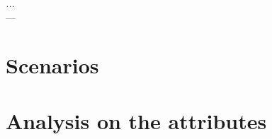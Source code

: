 \label{chap:methodology}


\begin{flushright}{\slshape
    ... } \\ \medskip
    --- {}
\end{flushright}

\minitoc\mtcskip
\vfill

\section{Scenarios}
\label{sec:scenarios}

\section{Analysis on the attributes}
\label{sec:attributes}